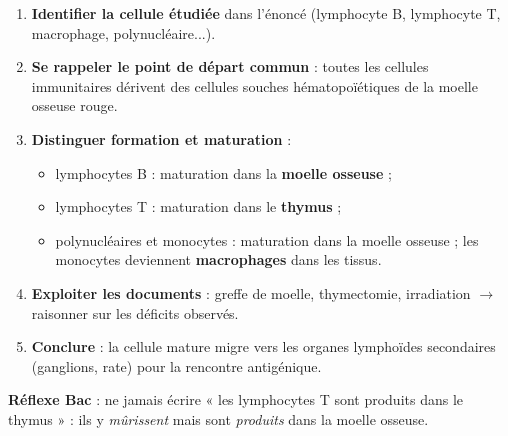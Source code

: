 \documentclass[11pt]{article}
\newcommand{\cle}[1]{{\popxbold\color{popdark}#1}}
\begin{document}
\begin{methode}
\begin{enumerate}
\item \textbf{Identifier la cellule étudiée} dans l'énoncé (lymphocyte B, lymphocyte T, macrophage, polynucléaire...).
\item \textbf{Se rappeler le point de départ commun} : toutes les cellules immunitaires dérivent des \cle{cellules souches hématopoïétiques} de la \cle{moelle osseuse rouge}.
\item \textbf{Distinguer formation et maturation} :
      \begin{itemize}
      \item lymphocytes \cle{B} : maturation dans la \textbf{moelle osseuse} ;
      \item lymphocytes \cle{T} : maturation dans le \textbf{thymus} ;
      \item polynucléaires et monocytes : maturation dans la moelle osseuse ; les monocytes deviennent \textbf{macrophages} dans les tissus.
      \end{itemize}
\item \textbf{Exploiter les documents} : greffe de moelle, thymectomie, irradiation $\rightarrow$ raisonner sur les déficits observés.
\item \textbf{Conclure} : la cellule mature migre vers les organes lymphoïdes secondaires (ganglions, rate) pour la rencontre antigénique.
\end{enumerate}
\textbf{Réflexe Bac} : ne jamais écrire « les lymphocytes T sont produits dans le thymus » : ils y \emph{mûrissent} mais sont \emph{produits} dans la moelle osseuse.
\end{methode}
\end{document}
